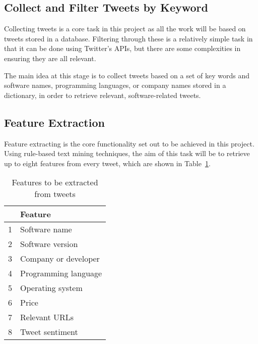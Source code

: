 \subsection{Collect and Filter Tweets by Keyword}
Collecting tweets is a core task in this project as all the work will be based on tweets stored in a database. Filtering through these is a relatively simple task in that it can be done using Twitter's APIs, but there are some complexities in ensuring they are all relevant.

The main idea at this stage is to collect tweets based on a set of key words and software names, programming languages, or company names stored in a dictionary, in order to retrieve relevant, software-related tweets.

\subsection{Feature Extraction}
Feature extracting is the core functionality set out to be achieved in this project. Using rule-based text mining techniques, the aim of this task will be to retrieve up to eight features from every tweet, which are shown in Table~\ref{features}.

\begin{table}
\begin{center}
\begin{tabular}{|r|l|}\hline\hline
&Feature\\\hline
1&Software name\\
2&Software version\\
3&Company or developer\\
4&Programming language\\
5&Operating system\\
6&Price\\
7&Relevant URLs\\
8&Tweet sentiment\\\hline\hline
\end{tabular}
\end{center}
\caption{Features to be extracted from tweets}\label{features}
\end{table}

